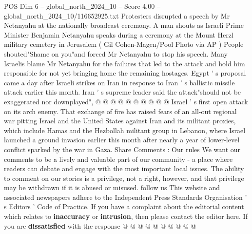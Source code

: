 \begin{textsample}{POS Dim 6 – global\_north\_2024\_10 – Score 4.00 – global\_north\_2024\_10/116652925.txt}
Protesters disrupted a speech by Mr Netanyahu at the nationally broadcast ceremony.
A man shouts as Israeli Prime Minister Benjamin Netanyahu speaks during a ceremony at the Mount Herzl military cemetery in Jerusalem ( Gil Cohen-Magen/Pool Photo via AP ) People shouted"Shame on you"and forced Mr Netanyahu to stop his speech.
Many Israelis blame Mr Netanyahu for the failures that led to the attack and hold him responsible for not yet bringing home the remaining hostages.
Egypt ' s proposal came a day after Israeli strikes on Iran in response to Iran ' s ballistic missile attack earlier this month.
Iran ' s supreme leader said the attack"should not be exaggerated nor downplayed", @ @ @ @ @ @ @ @ @ @ Israel ' s first open attack on its arch enemy.
That exchange of fire has raised fears of an all-out regional war pitting Israel and the United States against Iran and its militant proxies, which include Hamas and the Hezbollah militant group in Lebanon, where Israel launched a ground invasion earlier this month after nearly a year of lower-level conflict sparked by the war in Gaza.
Share Comments : Our rules We want our comments to be a lively and valuable part of our community - a place where readers can debate and engage with the most important local issues.
The ability to comment on our stories is a privilege, not a right, however, and that privilege may be withdrawn if it is abused or misused. follow us This website and associated newspapers adhere to the Independent Press Standards Organisation ' s Editors ' Code of Practice.
If you have a complaint about the editorial content which relates to \textbf{inaccuracy} or \textbf{intrusion}, then please contact the editor here.
If you are \textbf{dissatisfied} with the response @ @ @ @ @ @ @ @ @ @

\end{textsample}
